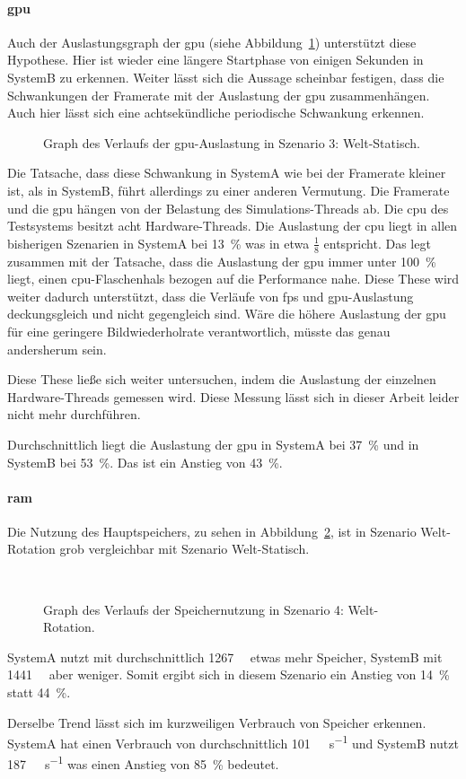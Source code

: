 \paragraph{\ac{gpu}}
Auch der Auslastungsgraph der \ac{gpu} (siehe Abbildung~\ref{fig:seed-0-rotate-gpu}) unterstützt diese Hypothese. Hier ist wieder eine längere Startphase von einigen Sekunden in SystemB zu erkennen. Weiter lässt sich die Aussage scheinbar festigen, dass die Schwankungen der Framerate mit der Auslastung der \ac{gpu} zusammenhängen. Auch hier lässt sich eine achtsekündliche periodische Schwankung erkennen.
\begin{figure}[!htbp]
	\caption[Graph des Verlaufs der -Auslastung in Szenario 4: Welt-Rotation.]{Graph des Verlaufs der \ac{gpu}-Auslastung in Szenario 3: Welt-Statisch.}\label{fig:seed-0-rotate-gpu}
\end{figure}
Die Tatsache, dass diese Schwankung in SystemA wie bei der Framerate kleiner ist, als in SystemB, führt allerdings zu einer anderen Vermutung. Die Framerate und die \ac{gpu} hängen von der Belastung des Simulations-Threads ab. Die \ac{cpu} des Testsystems besitzt acht Hardware-Threads. Die Auslastung der \ac{cpu} liegt in allen bisherigen Szenarien in SystemA bei \SI{13}{\percent} was in etwa $\frac{1}{8}$ entspricht. Das legt zusammen mit der Tatsache, dass die Auslastung der \ac{gpu} immer unter \SI{100}{\percent} liegt, einen \ac{cpu}-Flaschenhals bezogen auf die Performance nahe. Diese These wird weiter dadurch unterstützt, dass die Verläufe von \ac{fps} und \ac{gpu}-Auslastung deckungsgleich und nicht gegengleich sind. Wäre die höhere Auslastung der \ac{gpu} für eine geringere Bildwiederholrate verantwortlich, müsste das genau andersherum sein.

Diese These ließe sich weiter untersuchen, indem die Auslastung der einzelnen Hardware-Threads gemessen wird. Diese Messung lässt sich in dieser Arbeit leider nicht mehr durchführen. 

Durchschnittlich liegt die Auslastung der \ac{gpu} in SystemA bei \SI{37}{\percent} und in SystemB bei \SI{53}{\percent}. Das ist ein Anstieg von \SI{43}{\percent}.

\paragraph{\ac{ram}}
Die Nutzung des Hauptspeichers, zu sehen in Abbildung~\ref{fig:seed-0-rotate-mem}, ist in Szenario Welt-Rotation grob vergleichbar mit Szenario Welt-Statisch.
\begin{figure}[!htbp]
	\\
	\caption{Graph des Verlaufs der Speichernutzung in Szenario 4: Welt-Rotation.}\label{fig:seed-0-rotate-mem}	
\end{figure} 
SystemA nutzt mit durchschnittlich \SI{1267}{\mega\byte} etwas mehr Speicher, SystemB mit \SI{1441}{\mega\byte} aber weniger. Somit ergibt sich in diesem Szenario ein Anstieg von \SI{14}{\percent} statt \SI{44}{\percent}. 

Derselbe Trend lässt sich im kurzweiligen Verbrauch von Speicher erkennen. SystemA hat einen Verbrauch von durchschnittlich \SI{101}{\mega\byte\per\second} und SystemB nutzt \SI{187}{\mega\byte\per\second} was einen Anstieg von \SI{85}{\percent} bedeutet.
